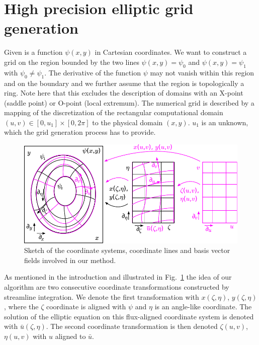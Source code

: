 \section{High precision elliptic grid generation} \label{sec:geometry}

Given is a function $\psi(x,y)$ in Cartesian coordinates. 
We want to construct a grid on the region 
bounded by the two lines
$\psi(x,y) = \psi_0$ and $\psi(x,y)=\psi_1$ with $\psi_0\neq\psi_1$.
The derivative of the function $\psi$ may not vanish within this region and on the boundary and 
we further assume that the region is topologically a ring. 
Note here that this excludes the description of domains with an X-point (saddle point) or O-point (local extremum). 
The numerical grid is described by a mapping of the discretization of the rectangular
computational domain $(u,v) \in [0,u_1]\times[0,2\pi]$ to the physical domain $(x,y)$. $u_1$ is an unknown, which the grid generation process has to provide. 

\begin{figure}[htbp]
\centering
\includegraphics[trim = 0px 0px 0px 0px, clip, scale=1.0]{./drawing_magenta}
\caption{
  Sketch of the coordinate systems, coordinate lines and basis vector fields 
  involved in our method.
}
\label{fig:sketch}
\end{figure}
As mentioned in the introduction and illustrated in Fig.~\ref{fig:sketch} the idea of our algorithm are two consecutive coordinate transformations constructed by streamline integration. 
We denote the first transformation with $x(\zeta, \eta)$, $y(\zeta, \eta)$, where
the $\zeta$ coordinate is aligned with $\psi$ and $\eta$ is an angle-like coordinate. The solution of the 
elliptic equation on this flux-aligned coordinate system is denoted with $\bar u(\zeta, \eta)$. 
The second coordinate transformation is then denoted $\zeta(u,v)$, $\eta(u,v)$ with $u$ aligned to $\bar u$.

